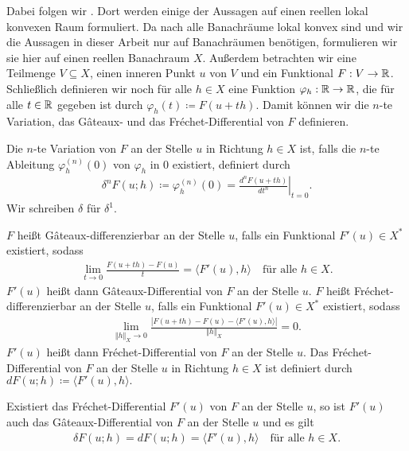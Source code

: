 Dabei folgen wir \cite[S. 189-194]{Zei85}. 
Dort werden einige der Aussagen auf einen reellen lokal konvexen
Raum formuliert. Da nach \cite[S. 781, (43)]{Zei86} alle Banachräume 
lokal konvex sind und wir die Aussagen in dieser Arbeit
nur auf Banachräumen benötigen, formulieren wir sie hier auf einen reellen 
Banachraum $X$. 
Außerdem betrachten wir eine Teilmenge $V\subseteq X$, einen
inneren Punkt $u$ von $V$ und ein Funktional $F:V\to\mathbb{R}$. 
Schließlich definieren wir noch für alle $h\in X$ eine Funktion
$\varphi_h:\mathbb{R}\to\mathbb{R}$, die für alle $t\in\mathbb{R}$ gegeben ist durch
$\varphi_h(t)\coloneqq F(u+th)$.
Damit können wir die $n$-te Variation, das G\^ateaux- und das 
Fr\'echet-Differential von $F$ definieren.

\begin{definition}[$n$-te Variation]
  Die $n$-te Variation von $F$ an der Stelle $u$ in Richtung $h\in X$ ist,
  falls die $n$-te Ableitung $\varphi_h^{(n)}(0)$ von $\varphi_h$ in $0$
  existiert, definiert durch 
  \begin{align*}
    \delta^n F(u;h)\coloneqq \varphi_h^{(n)}(0)=
    \left. \frac{d^n F(u+th)}{dt^n}\right|_{t=0}.
  \end{align*}
  Wir schreiben $\delta$ für $\delta^1$.
\end{definition}

\begin{definition}
  $F$ heißt G\^ateaux-differenzierbar an der Stelle $u$, falls ein 
  Funktional $F'(u)\in X^\ast$ existiert, sodass
  \begin{align*}
    \lim_{t\to 0}\frac{F(u+th)-F(u)}{t} = \langle F'(u), h\rangle\quad
    \text{für alle } h\in X.
  \end{align*}
  $F'(u)$ heißt dann G\^ateaux-Differential von $F$ an der Stelle $u$.
  $F$ heißt Fr\'echet-dif\-fe\-ren\-zier\-bar an der Stelle $u$, falls ein
  Funktional $F'(u)\in X^\ast$ existiert, sodass
  \begin{align*}
    \lim_{\Vert h\Vert_X\to 0}\frac{|F(u+th)-F(u)-
    \langle F'(u),h\rangle|}{\Vert h\Vert_X} =0.
  \end{align*}
  $F'(u)$ heißt dann Fr\'echet-Differential von $F$ an der Stelle $u$.
  Das Fr\'echet-Differential von $F$ an der Stelle $u$ in Richtung $h\in X$
  ist definiert durch $dF(u;h)\coloneqq \langle F'(u),h\rangle.$
\end{definition}

\begin{remark}
  Existiert das Fr\'echet-Differential $F'(u)$ von $F$ an der Stelle
    $u$, so ist $F'(u)$ auch das G\^ateaux-Differential von $F$ an der Stelle
    $u$ und es gilt 
    \begin{align*}
      \delta F(u;h)=dF(u;h)=\langle F'(u),h\rangle\quad\text{für alle } h\in X.
    \end{align*}
\end{remark}

